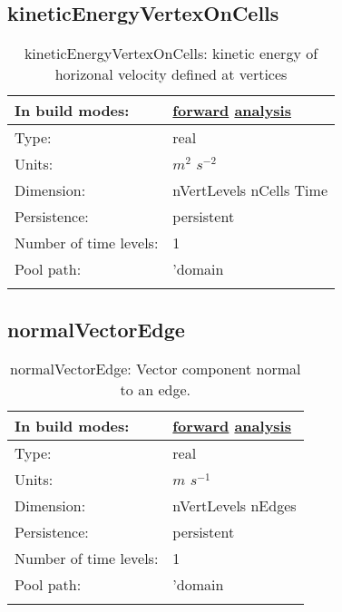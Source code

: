 \subsection[kineticEnergyVertexOnCells]{kineticEnergyVertexOnCells}
\label{subsec:var_sec_scratch_kineticEnergyVertexOnCells}
\begin{center}
\begin{longtable}{| p{2.0in} | p{4.0in} |}
        \hline 
        In build modes: & \hyperref[subsec:forward_var_tab_scratch]{forward} \hyperref[subsec:analysis_var_tab_scratch]{analysis} \\
        \hline 
        Type: & real \\
        \hline 
        Units: & $m^2$ $s^{-2}$ \\
        \hline 
        Dimension: & nVertLevels nCells Time \\
        \hline 
        Persistence: & persistent \\
        \hline 
        Number of time levels: & 1 \\
        \hline 
            Pool path: & 'domain %
 \\
		 \hline 
    \caption{kineticEnergyVertexOnCells: kinetic energy of horizonal velocity defined at vertices}
\end{longtable}
\end{center}
\subsection[normalVectorEdge]{normalVectorEdge}
\label{subsec:var_sec_scratch_normalVectorEdge}
\begin{center}
\begin{longtable}{| p{2.0in} | p{4.0in} |}
        \hline 
        In build modes: & \hyperref[subsec:forward_var_tab_scratch]{forward} \hyperref[subsec:analysis_var_tab_scratch]{analysis} \\
        \hline 
        Type: & real \\
        \hline 
        Units: & $m$ $s^{-1}$ \\
        \hline 
        Dimension: & nVertLevels nEdges \\
        \hline 
        Persistence: & persistent \\
        \hline 
        Number of time levels: & 1 \\
        \hline 
            Pool path: & 'domain %
 \\
		 \hline 
    \caption{normalVectorEdge: Vector component normal to an edge.}
\end{longtable}
\end{center}
